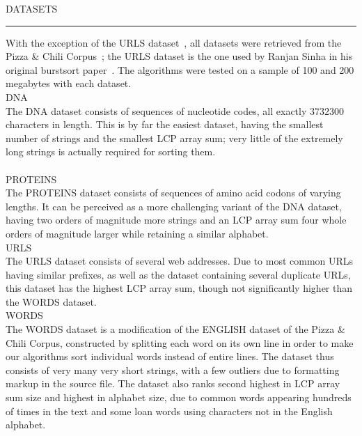 {\sffamily\normalsize{\color{sciorange}DATASETS}}\small\\
\rule[3mm]{190mm}{0.1pt}\vspace{-7mm}
 \footnotesize 
\begin{multicols}{3}
With the exception of the URLS dataset~\cite{sinha}, all datasets were retrieved from
the Pizza \& Chili Corpus~\cite{fn2005}; the URLS dataset is the one used by Ranjan Sinha
in his original burstsort paper~\cite{sw2008}. The algorithms were tested on a sample
of 100 and 200 megabytes with each dataset.\vspace{1.5mm}\\
{\sffamily\small{\color{sciorange}DNA}}\small\\
\footnotesize 
The DNA dataset consists of sequences of nucleotide codes, all exactly $3732300$
characters in length.  This is by far the easiest dataset, having the smallest
number of strings and the smallest LCP array sum; very little of the extremely
long strings is actually required for sorting them.\vspace{1.5mm}\\\\
{\sffamily\small{\color{sciorange}PROTEINS}}\small\\
\footnotesize 
The PROTEINS dataset consists of sequences of amino acid codons of varying
lengths.  It can be perceived as a more challenging variant of the DNA dataset,
having two orders of magnitude more strings and an LCP array sum four whole
orders of magnitude larger while retaining a similar alphabet.\vspace{1.5mm}\\
{\sffamily\small{\color{sciorange}URLS}}\small\\
\footnotesize 
The URLS dataset consists of several web addresses.  Due to most common URLs
having similar prefixes, as well as the dataset containing several duplicate
URLs, this dataset has the highest LCP array sum, though not significantly
higher than the WORDS dataset.\vspace{1.5mm}\\
{\sffamily\small{\color{sciorange}WORDS}}\small\\
\footnotesize 
The WORDS dataset is a modification of the ENGLISH dataset of the Pizza \& Chili
Corpus, constructed by splitting each word on its own line in order to make our
algorithms sort individual words instead of entire lines.  The dataset thus
consists of very many very short strings, with a few outliers due to formatting
markup in the source file.  The dataset also ranks second highest in LCP array
sum size and highest in alphabet size, due to common words appearing hundreds of
times in the text and some loan words using characters not in the English
alphabet.\\
\end{multicols}
